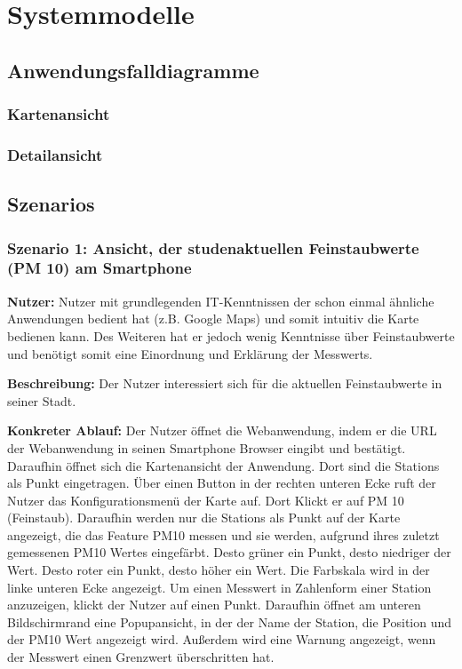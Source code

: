 \section{Systemmodelle}

\subsection{Anwendungsfalldiagramme}

\subsubsection*{Kartenansicht}
\noindent{}

\subsubsection*{Detailansicht}
\noindent{}
\newpage

\subsection{Szenarios}

\subsubsection*{Szenario 1: Ansicht, der studenaktuellen Feinstaubwerte (PM 10) am Smartphone}
\textbf{Nutzer:} Nutzer mit grundlegenden IT-Kenntnissen der schon einmal ähnliche Anwendungen bedient hat (z.B. Google Maps) 
und somit intuitiv die Karte bedienen kann. Des Weiteren hat er jedoch wenig Kenntnisse über Feinstaubwerte und benötigt somit 
eine Einordnung und Erklärung der \glspl{Messwert}.

\textbf{Beschreibung:} Der Nutzer interessiert sich für die aktuellen Feinstaubwerte in seiner Stadt.

\textbf{Konkreter Ablauf:}
Der Nutzer öffnet die \gls{Webanwendung}, indem er die URL der \gls{Webanwendung} in seinen Smartphone Browser eingibt und bestätigt. Daraufhin öffnet 
sich die Kartenansicht der Anwendung. Dort sind die \glspl{Station} als Punkt eingetragen. Über einen Button in der rechten unteren 
Ecke ruft der Nutzer das Konfigurationsmenü der Karte auf. Dort Klickt er auf PM 10 (Feinstaub). Daraufhin werden nur die 
\glspl{Station} als Punkt auf der Karte angezeigt, die das \gls{Feature} PM10 messen und sie werden, aufgrund ihres zuletzt 
gemessenen PM10 Wertes eingefärbt. Desto grüner ein Punkt, desto niedriger der Wert. Desto roter ein Punkt, desto höher ein Wert. 
Die Farbskala wird in der linke unteren Ecke angezeigt.
Um einen \gls{Messwert} in Zahlenform einer \gls{Station} anzuzeigen, klickt der Nutzer auf einen Punkt. Daraufhin öffnet am 
unteren Bildschirmrand eine Popupansicht, in der der Name der \gls{Station}, die Position und der PM10 Wert angezeigt wird. 
Außerdem wird eine Warnung angezeigt, wenn der \gls{Messwert} einen Grenzwert überschritten hat.
\newpage

